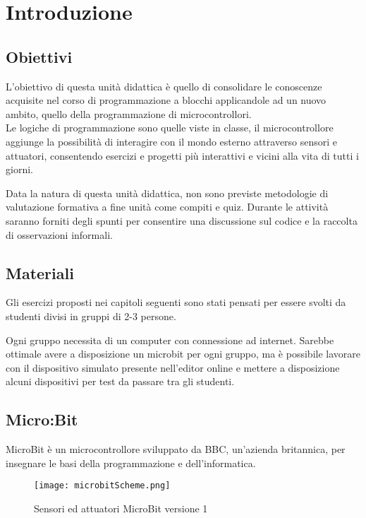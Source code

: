 \documentclass[../../docenti.tex]{subfiles}
\begin{document}
\section{Introduzione}

\subsection{Obiettivi}
L'obiettivo di questa unità didattica è quello di consolidare le conoscenze acquisite nel corso di programmazione a blocchi applicandole ad un nuovo ambito, quello della programmazione di microcontrollori.\\
Le logiche di programmazione sono quelle viste in classe, il microcontrollore aggiunge la possibilità di interagire con il mondo esterno attraverso sensori e attuatori, consentendo esercizi e progetti più interattivi e vicini alla vita di tutti i giorni. 

Data la natura di questa unità didattica, non sono previste metodologie di valutazione formativa a fine unità come compiti e quiz. Durante le attività saranno forniti degli spunti per consentire una discussione sul codice e la raccolta di osservazioni informali.

\subsection{Materiali}
Gli esercizi proposti nei capitoli seguenti sono stati pensati per essere svolti da studenti divisi in gruppi di 2-3 persone.

Ogni gruppo necessita di un computer con connessione ad internet. Sarebbe ottimale avere a disposizione un microbit per ogni gruppo, ma è possibile lavorare con il dispositivo simulato presente nell'editor online e mettere a disposizione alcuni dispositivi per test da passare tra gli studenti.

\newpage
\subsection{Micro:Bit}
 MicroBit è un microcontrollore sviluppato da BBC, un'azienda britannica, per insegnare le basi della programmazione e dell'informatica.

\begin{figure}[H]
 	\centering
 	\texttt{[image: microbitScheme.png]}
 	\caption{Sensori ed attuatori MicroBit versione 1 \parencite{MicrobitOverview}}
 	\label{fig:microbit}
\end{figure}
\end{document}
